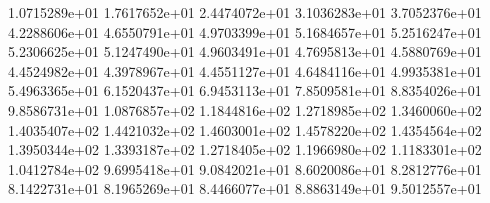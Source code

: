 1.0715289e+01
 1.7617652e+01
 2.4474072e+01
 3.1036283e+01
 3.7052376e+01
 4.2288606e+01
 4.6550791e+01
 4.9703399e+01
 5.1684657e+01
 5.2516247e+01
 5.2306625e+01
 5.1247490e+01
 4.9603491e+01
 4.7695813e+01
 4.5880769e+01
 4.4524982e+01
 4.3978967e+01
 4.4551127e+01
 4.6484116e+01
 4.9935381e+01
 5.4963365e+01
 6.1520437e+01
 6.9453113e+01
 7.8509581e+01
 8.8354026e+01
 9.8586731e+01
 1.0876857e+02
 1.1844816e+02
 1.2718985e+02
 1.3460060e+02
 1.4035407e+02
 1.4421032e+02
 1.4603001e+02
 1.4578220e+02
 1.4354564e+02
 1.3950344e+02
 1.3393187e+02
 1.2718405e+02
 1.1966980e+02
 1.1183301e+02
 1.0412784e+02
 9.6995418e+01
 9.0842021e+01
 8.6020086e+01
 8.2812776e+01
 8.1422731e+01
 8.1965269e+01
 8.4466077e+01
 8.8863149e+01
 9.5012557e+01
